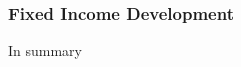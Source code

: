 \documentclass[compress]{beamer}
\begin{document}
\begin{frame}
	\frametitle{Fixed Income Development}
	\begin{center}\huge In summary\end{center}
	\begin{center}
	\end{center}

\end{frame}
\end{document}

